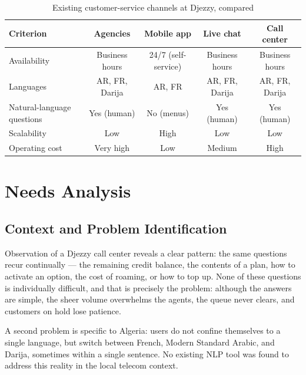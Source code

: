\documentclass[12pt, a4paper]{report}
\newcommand{\humantext}[1]{#1}      %
\begin{document}
\begin{table}[H]
\centering
\caption{Existing customer-service channels at Djezzy, compared}
\label{tab:channels}
\begin{tabularx}{\textwidth}{X c c c c}
\toprule
\textbf{Criterion} & \textbf{Agencies} & \textbf{Mobile app} & \textbf{Live chat} & \textbf{Call center} \\
\midrule
Availability               & Business hours & 24/7 (self-service) & Business hours & Business hours \\
Languages                  & AR, FR, Darija & AR, FR              & AR, FR, Darija & AR, FR, Darija \\
Natural-language questions & Yes (human)    & No (menus)          & Yes (human)    & Yes (human) \\
Scalability                & Low            & High                & Low            & Low \\
Operating cost             & Very high      & Low                 & Medium         & High \\
\bottomrule
\end{tabularx}
\end{table}


\section{Needs Analysis}

\subsection{Context and Problem Identification}

\humantext{Observation of a Djezzy call center reveals a clear pattern: the same questions recur continually --- the remaining credit balance, the contents of a plan, how to activate an option, the cost of roaming, or how to top up.} \humantext{None of these questions is individually difficult, and that is precisely the problem: although the answers are simple, the sheer volume overwhelms the agents, the queue never clears, and customers on hold lose patience.}

\humantext{A second problem is specific to Algeria: users do not confine themselves to a single language, but switch between French, Modern Standard Arabic, and Darija, sometimes within a single sentence. No existing NLP tool was found to address this reality in the local telecom context.}
\end{document}

